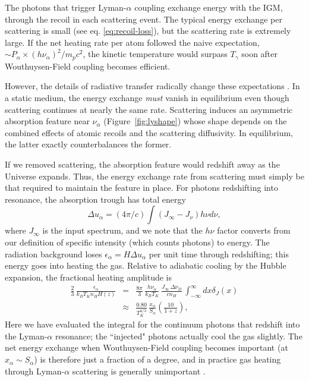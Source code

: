 The photons that trigger Lyman-$\alpha$ coupling exchange energy with the IGM, through the recoil in each scattering event. The typical energy exchange per scattering is small (see eq. \ref{eq:recoil-loss}), but the scattering rate is extremely large.  If the net heating rate per atom followed the naive expectation, $\sim
P_\alpha \times (h \nu_\alpha)^2/m_p c^2$, the kinetic temperature would surpass $T_\gamma$ soon after Wouthuysen-Field coupling becomes efficient.

However, the details of radiative transfer radically change these expectations \cite{chen04}.  In a static medium, the energy exchange \emph{must} vanish in equilibrium even though scattering continues at nearly the same rate.
Scattering induces an asymmetric absorption feature near $\nu_\alpha$ (Figure~\ref{fig:lyshape}) whose shape depends on the combined effects of atomic recoils and the scattering diffusivity.  In equilibrium, the latter exactly counterbalances the former.  

If we removed scattering, the absorption feature would redshift away as the Universe expands. Thus, the energy exchange rate from scattering must simply be that required to maintain the feature in place.  For photons redshifting into resonance, the absorption trough has total energy 
\begin{equation}
\Delta u_\alpha = (4\pi/c) \int (J_\infty - J_\nu) h \nu d \nu,
\end{equation}
where $J_\infty$ is the input spectrum, and we note that the $h \nu$ factor converts from our definition of specific intensity (which counts photons) to energy.  The radiation background loses $\epsilon_\alpha = H \Delta u_\alpha$ per
unit time through redshifting; this energy goes into heating the gas.
Relative to adiabatic cooling by the Hubble expansion, the fractional
heating amplitude is
\begin{eqnarray}
\frac{2}{3} \, \frac{\epsilon_\alpha}{k_B T_K n_H H(z) } & = & \frac{8 \pi}{3} \, \frac{h \nu_\alpha}{k_B T_K} \, \frac{J_\infty \, \Delta \nu_D}{c n_H} \, \int_{-\infty}^{\infty} d x \delta_J(x) \label{eq:epsalpha}
\\
& \approx & \frac{0.80}{T_K^{4/3}} \, \frac{x_\alpha}{S_\alpha} \left( \frac{10}{1+z} \right),
\label{eq:lyaheat}
\end{eqnarray}
Here we have evaluated the integral for the continuum photons that
redshift into the Lyman-$\alpha$ resonance; the ``injected" photons
actually cool the gas slightly.  The net energy exchange when
Wouthuysen-Field coupling becomes important (at $x_\alpha \sim
S_\alpha$) is therefore just a fraction of a degree, and in practice gas heating through Lyman-$\alpha$ scattering
is generally unimportant \cite{chen04,furl06-lyheat}.

